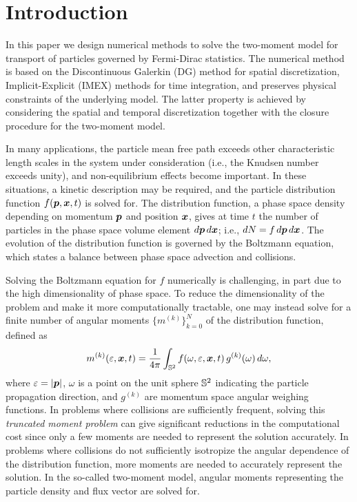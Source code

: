 \section{Introduction}
\label{sec:intro}

In this paper we design numerical methods to solve the two-moment model for transport of particles governed by Fermi-Dirac statistics.  
The numerical method is based on the Discontinuous Galerkin (DG) method for spatial discretization, Implicit-Explicit (IMEX) methods for time integration, and preserves physical constraints of the underlying model.  
The latter property is achieved by considering the spatial and temporal discretization together with the closure procedure for the two-moment model.  

In many applications, the particle mean free path exceeds other characteristic length scales in the system under consideration (i.e., the Knudsen number exceeds unity), and non-equilibrium effects become important.  
In these situations, a kinetic description may be required, and the particle distribution function $f(\boldsymbol{p},\boldsymbol{x},t)$ is solved for.  
The distribution function, a phase space density depending on momentum $\boldsymbol{p}$ and position $\boldsymbol{x}$, gives at time $t$ the number of particles in the phase space volume element $d\boldsymbol{p}\,d\boldsymbol{x}$; i.e., $dN=f\,d\boldsymbol{p}\,d\boldsymbol{x}$.  
The evolution of the distribution function is governed by the Boltzmann equation, which states a balance between phase space advection and collisions.  

Solving the Boltzmann equation for $f$ numerically is challenging, in part due to the high dimensionality of phase space.  
To reduce the dimensionality of the problem and make it more computationally tractable, one may instead solve for a finite number of angular moments $\{m^{(k)}\}_{k=0}^{N}$ of the distribution function, defined as
\begin{equation}
  m^{(k)}(\varepsilon,\boldsymbol{x},t)=\frac{1}{4\pi}\int_{\mathbb{S}^{2}}f(\omega,\varepsilon,\boldsymbol{x},t)\,g^{(k)}(\omega)\,d\omega,
\end{equation}
where $\varepsilon=|\boldsymbol{p}|$, $\omega$ is a point on the unit sphere $\mathbb{S}^{2}$ indicating the particle propagation direction, and $g^{(k)}$ are momentum space angular weighing functions.  
In problems where collisions are sufficiently frequent, solving this \emph{truncated moment problem} can give significant reductions in the computational cost since only a few moments are needed to represent the solution accurately.  
In problems where collisions do not sufficiently isotropize the angular dependence of the distribution function, more moments are needed to accurately represent the solution.  
In the so-called two-moment model, angular moments representing the particle density and flux vector are solved for.  

